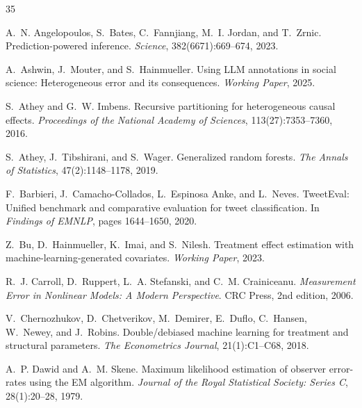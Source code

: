 \documentclass[11pt,twocolumn]{article}
\theoremstyle{remark}
\begin{document}
\begin{thebibliography}{35}
\small

A.~N. Angelopoulos, S.~Bates, C.~Fannjiang, M.~I. Jordan, and T.~Zrnic.
\newblock Prediction-powered inference.
\newblock \emph{Science}, 382(6671):669--674, 2023.

A.~Ashwin, J.~Mouter, and S.~Hainmueller.
\newblock Using LLM annotations in social science: Heterogeneous error and its consequences.
\newblock \emph{Working Paper}, 2025.

S.~Athey and G.~W. Imbens.
\newblock Recursive partitioning for heterogeneous causal effects.
\newblock \emph{Proceedings of the National Academy of Sciences}, 113(27):7353--7360, 2016.

S.~Athey, J.~Tibshirani, and S.~Wager.
\newblock Generalized random forests.
\newblock \emph{The Annals of Statistics}, 47(2):1148--1178, 2019.

F.~Barbieri, J.~Camacho-Collados, L.~Espinosa Anke, and L.~Neves.
\newblock TweetEval: Unified benchmark and comparative evaluation for tweet classification.
\newblock In \emph{Findings of EMNLP}, pages 1644--1650, 2020.

Z.~Bu, D.~Hainmueller, K.~Imai, and S.~Nilesh.
\newblock Treatment effect estimation with machine-learning-generated covariates.
\newblock \emph{Working Paper}, 2023.

R.~J. Carroll, D.~Ruppert, L.~A. Stefanski, and C.~M. Crainiceanu.
\newblock \emph{Measurement Error in Nonlinear Models: A Modern Perspective}.
\newblock CRC Press, 2nd edition, 2006.

V.~Chernozhukov, D.~Chetverikov, M.~Demirer, E.~Duflo, C.~Hansen, W.~Newey, and J.~Robins.
\newblock Double/debiased machine learning for treatment and structural parameters.
\newblock \emph{The Econometrics Journal}, 21(1):C1--C68, 2018.

A.~P. Dawid and A.~M. Skene.
\newblock Maximum likelihood estimation of observer error-rates using the EM algorithm.
\newblock \emph{Journal of the Royal Statistical Society: Series C}, 28(1):20--28, 1979.


\end{thebibliography}
\end{document}

